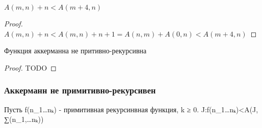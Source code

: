 \begin{lemma}
$A(m, n) + n < A(m + 4, n)$
\end{lemma}
\label{lemma5}
\begin{proof}
$A(m, n) + n
< A(m, n) + n + 1
= A(n, m) + A(0, n)
< A(m + 4, n)$
\end{proof}
\begin{theorem}
Функция аккерманна не притивно-рекурсивна
\end{theorem}
\begin{proof}
TODO
\end{proof}
\iffalse
\subsubsection{Аккерманн не примитивно-рекурсивен}
\label{sec-10-3-10}
Пусть f(n_1\ldots{}nₖ) - примитивная рекурсинвная функция, k ≥ 0.
\exists J:f(n_1\ldots{}nₖ)<A(J, ∑(n_1,\ldots{}nₖ))


